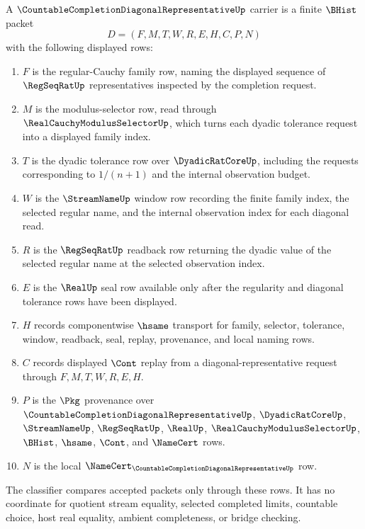 \begin{definition}
\label{def:countable-completion-diagonal-representative-carrier}
A $\CountableCompletionDiagonalRepresentativeUp$ carrier is a finite $\BHist$ packet
$$
D=(F,M,T,W,R,E,H,C,P,N)
$$
with the following displayed rows:
\begin{enumerate}
\item $F$ is the regular-Cauchy family row, naming the displayed sequence of $\RegSeqRatUp$ representatives inspected by the completion request.
\item $M$ is the modulus-selector row, read through $\RealCauchyModulusSelectorUp$, which turns each dyadic tolerance request into a displayed family index.
\item $T$ is the dyadic tolerance row over $\DyadicRatCoreUp$, including the requests corresponding to $1/(n+1)$ and the internal observation budget.
\item $W$ is the $\StreamNameUp$ window row recording the finite family index, the selected regular name, and the internal observation index for each diagonal read.
\item $R$ is the $\RegSeqRatUp$ readback row returning the dyadic value of the selected regular name at the selected observation index.
\item $E$ is the $\RealUp$ seal row available only after the regularity and diagonal tolerance rows have been displayed.
\item $H$ records componentwise $\hsame$ transport for family, selector, tolerance, window, readback, seal, replay, provenance, and local naming rows.
\item $C$ records displayed $\Cont$ replay from a diagonal-representative request through $F,M,T,W,R,E,H$.
\item $P$ is the $\Pkg$ provenance over $\CountableCompletionDiagonalRepresentativeUp$, $\DyadicRatCoreUp$, $\StreamNameUp$, $\RegSeqRatUp$, $\RealUp$, $\RealCauchyModulusSelectorUp$, $\BHist$, $\hsame$, $\Cont$, and $\NameCert$ rows.
\item $N$ is the local $\NameCert_{\CountableCompletionDiagonalRepresentativeUp}$ row.
\end{enumerate}
The classifier compares accepted packets only through these rows. It has no coordinate for quotient stream equality, selected completed limits, countable choice, host real equality, ambient completeness, or bridge checking.
\end{definition}

